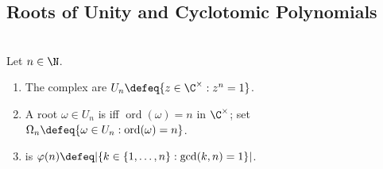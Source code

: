 \subsection{Roots of Unity and Cyclotomic Polynomials}

\begin{definition} \label{def:roots-of-unity-primitive-cyclotomic} \\
Let $n\in\N$.
\begin{enumerate}[label=(\roman*)]
\setlength{\itemsep}{0pt}
\item The complex  are $U_n\defeq\{z\in\C^\times:z^n=1\}$.
\item A root $\omega\in U_n$ is  iff $\operatorname{ord}(\omega)=n$ in $\C^\times$; set $\Omega_n\defeq\{\omega\in U_n:\operatorname{ord}(\omega)=n\}$.
\item {} is $\varphi(n)\defeq|\{k\in\{1,\ldots,n\}:\gcd(k,n)=1\}|$.
\end{enumerate}
\end{definition}

